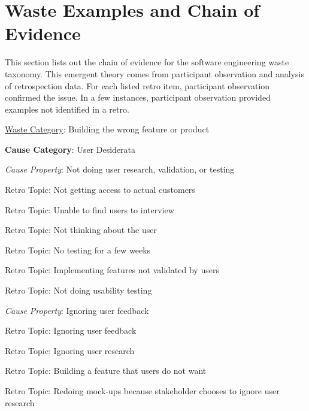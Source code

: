 
\chapter{Waste Examples and Chain of Evidence}
\label{AppendixChainOfEvidence}

This section lists out the chain of evidence for the software engineering waste taxonomy. This emergent theory comes from participant observation and analysis of retrospection data. For each listed retro item, participant observation confirmed the issue. In a few instances, participant observation provided examples not identified in a retro.







\underline{Waste Category}: Building the wrong feature or product

\quad \textbf{Cause Category}: User Desiderata

\quad \quad \textit{Cause Property}: Not doing user research, validation, or testing

\quad \quad \quad Retro Topic: Not getting access to actual customers

\quad \quad \quad Retro Topic: Unable to find users to interview

\quad \quad \quad Retro Topic: Not thinking about the user

\quad \quad \quad Retro Topic: No testing for a few weeks

\quad \quad \quad Retro Topic: Implementing features not validated by users

\quad \quad \quad Retro Topic: Not doing usability testing

\quad \quad \textit{Cause Property}: Ignoring user feedback

\quad \quad \quad Retro Topic: Ignoring user feedback

\quad \quad \quad Retro Topic: Ignoring user research

\quad \quad \quad Retro Topic: Building a feature that users do not want

\quad \quad \quad Retro Topic: Redoing mock-ups because stakeholder chooses to ignore user research

